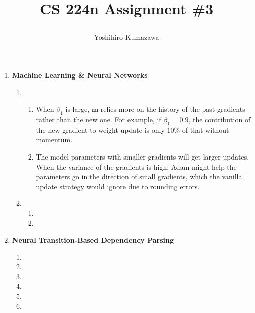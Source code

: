 \documentclass[12pt, dvipdfmx]{article}
\title{
  \vspace{-2cm}
  CS 224n Assignment \#3 \\
  \author{Yoshihiro Kumazawa}
}
\begin{document}
\maketitle
\begin{enumerate}[label=\textbf{\arabic*.}]
\item \textbf{Machine Learning \& Neural Networks}
\begin{enumerate}[label=(\alph*)]
\item
\begin{enumerate}[label=\roman*.]
\item When $\beta_1$ is large, $\bm{m}$ relies more on the history of the past gradients rather than the new one. For example, if $\beta_1=0.9$, the contribution of the new gradient to weight update is only 10\% of that without momentum.
\item The model parameters with smaller gradients will get larger updates. When the variance of the gradients is high, Adam might help the parameters go in the direction of small gradients, which the vanilla update strategy would ignore due to rounding errors.
\end{enumerate}
\item
\begin{enumerate}[label=\roman*.]
\item
\item
\end{enumerate}
\end{enumerate}
\item \textbf{Neural Transition-Based Dependency Parsing}
\begin{enumerate}[label=(\alph*)]
\item
\item
\item
\item
\item
\item
\end{enumerate}
\end{enumerate}
\end{document}
